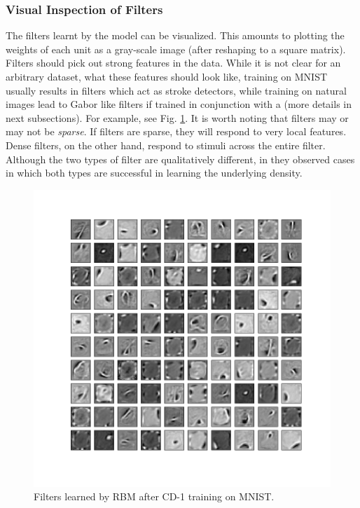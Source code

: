 \subsubsection{Visual Inspection of Filters}
The filters learnt by the model can be visualized. This amounts to plotting the weights of each unit as a gray-scale image (after reshaping to a square matrix). Filters should pick out strong features in the data. While it is not clear for an arbitrary dataset, what these features should look like, training on MNIST usually results in filters which act as stroke detectors, while training on natural images lead to Gabor like filters if trained in conjunction with a  (more details in next subsections). For example, see Fig. \ref{fig:rbm_filters}. It is worth noting that filters may or may not be \emph{sparse}. If filters are sparse, they will respond to very local features. Dense filters, on the other hand, respond to stimuli across the entire filter. Although the two types
of filter are qualitatively different, in \cite{yosinski2012visually} they observed cases in which both types are successful in learning the underlying density.
\begin{figure}[h]
\begin{mdframed}
\includegraphics[scale=0.4]{rbm-mnist/rbm_filters.png}
\centering
\caption{Filters learned by RBM after CD-1 training on MNIST.}
\label{fig:rbm_filters}
\end{mdframed}
\end{figure}

